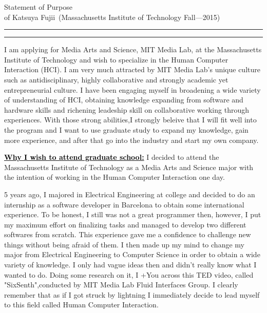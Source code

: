 \documentclass{article}
\newcommand{\soptitle}{Statement of Purpose}
\newcommand{\yourname}{Katsuya Fujii}
\newcommand{\statement}[1]{\par\medskip
  \underline{\textcolor{black}{\textbf{#1:}}}\space
}
\begin{document}
\begin{center}\LARGE\soptitle\\
\large of \yourname\ (Massachusetts Institute of Technology Fall---2015)
\end{center}

\hrule
\vspace{1pt}
\hrule height 1pt

\bigskip


I am applying for Media Arts and Science, MIT Media Lab, at the Massachusetts Institute of Technology and wish to specialize in the Human Computer Interaction (HCI). I am very much attracted by MIT Media Lab's unique culture such as antidisciplinary, highly collaborative and strongly academic yet entrepreneurial culture. I have been engaging myself in broadening a wide variety of understanding of HCI, obtaining knowledge expanding from software and hardware skills and richening leadeship skill on collaborative working through experiences. With those strong abilities,I strongly beleive that I will fit well into the program and I want to use graduate study to expand my knowledge, gain more experience, and after that go into the industry and start my own company.

\statement{Why I wish to attend graduate school} I decided to attend the Massachusetts Institute of Technology as a Media Arts and Science major with the intention of working in the Human Computer Interaction one day. 

5 years ago, I majored in Electrical Engineering at college and decided to do an internship as a software developer in Barcelona to obtain some international experience.  To be honest, I still was not a great programmer then, however, I put my maximum effort on finalizing tasks and managed to develop two different softwares from scratch. This experience gave me a confidence to challenge new things without being afraid of them. I then made up my mind to change my major from Electrical Engineering to Computer Science in order to obtain a wide variety of knowledge. I only had vague ideas then and didn't really know what I wanted to do. Doing some research on it, I +You across this TED video, called "SixSenth",conducted by MIT Media Lab Fluid Interfaces Group. I clearly remember that as if I got struck by lightning I immediately decide to lead myself to this field called Human Computer Interaction. 
\end{document}
